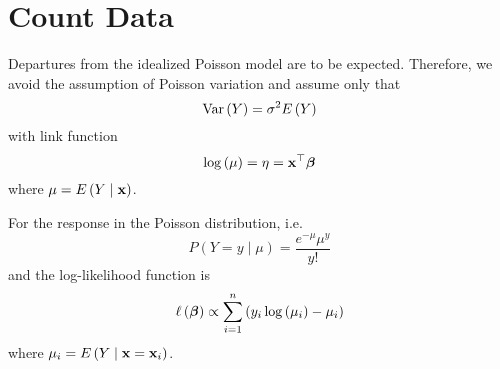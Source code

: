 \section{Count Data}

Departures from the idealized Poisson model are to be expected. Therefore, we avoid the assumption of Poisson variation and assume only that
\begin{equation}
	\mathrm{Var}\left(Y\right)=\sigma^{2}E\left(Y\right)
\end{equation}
with link function
\begin{equation}
	\log\left(\mu\right)=\eta=\mathbf{x}^{\top}\boldsymbol{\beta}
\end{equation}
where \(\mu=E\left(Y\mid\mathbf{x}\right)\).

For the response in the Poisson distribution, i.e.
\begin{equation*}
	P(Y=y\mid\mu)=\frac{e^{-\mu}\mu^{y}}{y!}
\end{equation*}
and the log-likelihood function is
\begin{equation}
	\ell\left(\boldsymbol{\beta}\right)\propto\sum_{i=1}^{n}\left(y_{i} \log\left(\mu_{i}\right)-\mu_{i}\right)
\end{equation}
where \(\mu_{i}=E\left(Y\mid\mathbf{x}=\mathbf{x}_{i}\right)\).
